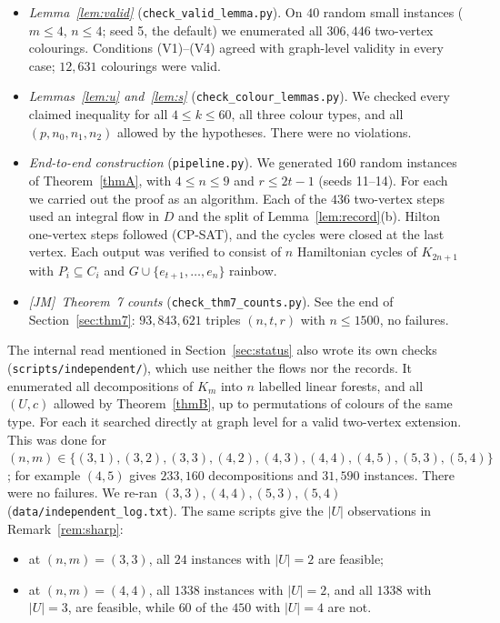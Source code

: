 \documentclass[11pt]{amsart}
\theoremstyle{definition}
\theoremstyle{remark}
\newcommand{\JM}{\textup{[JM]}}
\begin{document}
\begin{itemize}[leftmargin=*]
\item \emph{Lemma~\ref{lem:valid}} (\texttt{check\_valid\_lemma.py}). On $40$ random small
instances ($m\le4$, $n\le4$; seed 5, the default) we enumerated all $306{,}446$ two-vertex colourings. Conditions
(V1)--(V4) agreed with graph-level validity in every case; $12{,}631$ colourings were valid.

\item \emph{Lemmas~\ref{lem:u} and~\ref{lem:s}} (\texttt{check\_colour\_lemmas.py}). We
checked every claimed inequality for all $4\le k\le60$, all three colour types, and all
$(p,n_0,n_1,n_2)$ allowed by the hypotheses. There were no violations.

\item \emph{End-to-end construction} (\texttt{pipeline.py}). We generated $160$ random
instances of Theorem~\ref{thmA}, with $4\le n\le9$ and $r\le 2t-1$ (seeds 11--14). For each we
carried out the proof as an algorithm. Each of the $436$ two-vertex steps used an integral flow
in $D$ and the split of Lemma~\ref{lem:record}(b). Hilton one-vertex steps followed (CP-SAT),
and the cycles were closed at the last vertex. Each output was verified to consist of $n$
Hamiltonian cycles of $K_{2n+1}$ with $P_i\subseteq C_i$ and $G\cup\{e_{t+1},\dots,e_n\}$
rainbow.

\item \emph{\JM\ Theorem~7 counts} (\texttt{check\_thm7\_counts.py}). See the end of
Section~\ref{sec:thm7}: $93{,}843{,}621$ triples $(n,t,r)$ with $n\le1500$, no failures.
\end{itemize}

The internal read mentioned in Section~\ref{sec:status} also wrote its own checks
(\nolinkurl{scripts/independent/}), which use neither the flows nor the records. It enumerated
all decompositions of $K_m$ into $n$ labelled linear forests, and all $(U,c)$ allowed by
Theorem~\ref{thmB}, up to permutations of colours of the same type. For each it searched
directly at graph level for a valid two-vertex extension. This was done for
$(n,m)\in\{(3,1),(3,2),(3,3),(4,2),(4,3),(4,4),(4,5),(5,3),(5,4)\}$; for example $(4,5)$
gives $233{,}160$ decompositions and $31{,}590$ instances. There were no failures. We re-ran
$(3,3),(4,4),(5,3),(5,4)$ (\nolinkurl{data/independent_log.txt}). The same scripts give the
$|U|$ observations in Remark~\ref{rem:sharp}:
\begin{itemize}
\item at $(n,m)=(3,3)$, all $24$ instances with $|U|=2$ are feasible;
\item at $(n,m)=(4,4)$, all $1338$ instances with $|U|=2$, and all $1338$ with $|U|=3$, are
feasible, while $60$ of the $450$ with $|U|=4$ are not.
\end{itemize}
\end{document}
